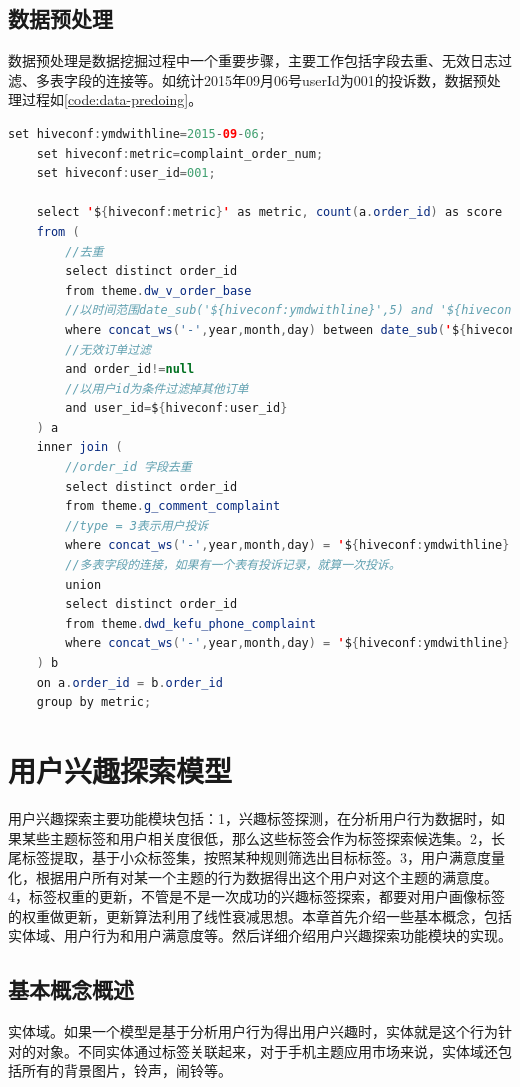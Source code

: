   \subsection{数据预处理}
  数据预处理是数据挖掘过程中一个重要步骤，主要工作包括字段去重、无效日志过滤、多表字段的连接等。如统计2015年09月06号userId为001的投诉数，数据预处理过程如\autoref{code:data-predoing}。
  \begin{lstlisting}[language=java,firstnumber=1,label={code:data-predoing}, caption={数据预处理脚本}]
    set hiveconf:ymdwithline=2015-09-06;
    set hiveconf:metric=complaint_order_num;
    set hiveconf:user_id=001;

    select '${hiveconf:metric}' as metric, count(a.order_id) as score
    from (
        //去重
        select distinct order_id
        from theme.dw_v_order_base
        //以时间范围date_sub('${hiveconf:ymdwithline}',5) and '${hiveconf:ymdwithline}'为条件过滤掉不符合条件的订单
        where concat_ws('-',year,month,day) between date_sub('${hiveconf:ymdwithline}',5) and '${hiveconf:ymdwithline}'
        //无效订单过滤
        and order_id!=null
        //以用户id为条件过滤掉其他订单
        and user_id=${hiveconf:user_id}
    ) a
    inner join (
        //order_id 字段去重
        select distinct order_id
        from theme.g_comment_complaint
        //type = 3表示用户投诉
        where concat_ws('-',year,month,day) = '${hiveconf:ymdwithline}' and type = 3
        //多表字段的连接，如果有一个表有投诉记录，就算一次投诉。
        union
        select distinct order_id
        from theme.dwd_kefu_phone_complaint
        where concat_ws('-',year,month,day) = '${hiveconf:ymdwithline}'
    ) b
    on a.order_id = b.order_id
    group by metric;
  \end{lstlisting}

\section{用户兴趣探索模型}
用户兴趣探索主要功能模块包括：1，兴趣标签探测，在分析用户行为数据时，如果某些主题标签和用户相关度很低，那么这些标签会作为标签探索候选集。2，长尾标签提取，基于小众标签集，按照某种规则筛选出目标标签。3，用户满意度量化，根据用户所有对某一个主题的行为数据得出这个用户对这个主题的满意度。4，标签权重的更新，不管是不是一次成功的兴趣标签探索，都要对用户画像标签的权重做更新，更新算法利用了线性衰减思想。本章首先介绍一些基本概念，包括实体域、用户行为和用户满意度等。然后详细介绍用户兴趣探索功能模块的实现。
  \subsection{基本概念概述}
  实体域。如果一个模型是基于分析用户行为得出用户兴趣时，实体就是这个行为针对的对象。不同实体通过标签关联起来，对于手机主题应用市场来说，实体域还包括所有的背景图片，铃声，闹铃等。

